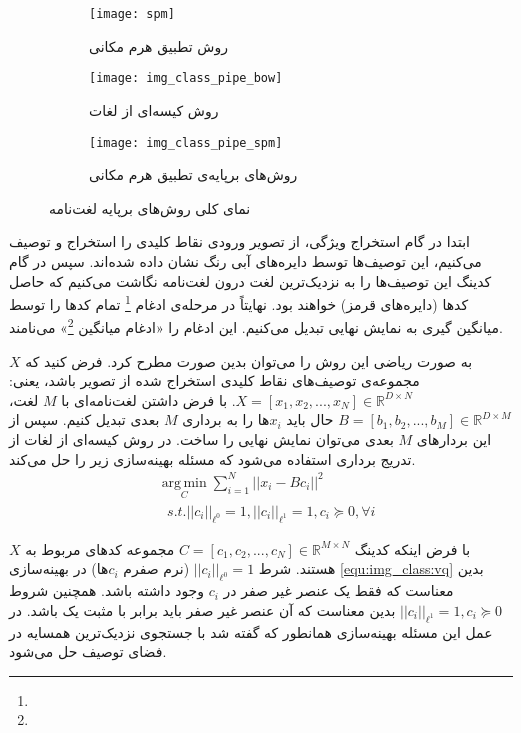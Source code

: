 \documentclass[11pt]{article}
\begin{document}
\begin{figure}[t]
	\centering
	\begin{subfigure}[h]{0.7\textwidth}
		\centering
		\texttt{[image: spm]}
		\caption{روش تطبیق هرم مکانی}
		\label{fig:img_class:pipe:spm}
	\end{subfigure}
	\begin{subfigure}[h]{0.3\textwidth}
		\centering
		\texttt{[image: img\_class\_pipe\_bow]}
		\caption{روش کیسه‌ای از لغات}
		\label{fig:img_class:pipe:bow}
	\end{subfigure}
	\begin{subfigure}[h]{0.3\textwidth}
		\centering
		\texttt{[image: img\_class\_pipe\_spm]}
		\caption{روش‌های برپایه‌ی تطبیق هرم مکانی}
		\label{fig:img_class:pipe:gen}
	\end{subfigure}
	\caption{نمای کلی روش‌های برپایه لغت‌نامه}
	\label{fig:img_class:pipe}
\end{figure}
ابتدا در گام استخراج ویژگی، از تصویر ورودی نقاط کلیدی را استخراج و توصیف می‌کنیم، این توصیف‌ها توسط دایره‌های آبی رنگ نشان داده شده‌اند. سپس در گام کدینگ این توصیف‌ها را به نزدیک‌ترین لغت درون لغت‌نامه نگاشت می‌کنیم که حاصل کدها (دایره‌های قرمز) خواهند بود. نهایتاً در مرحله‌ی ادغام
\footnote{}
تمام کدها را توسط میانگین گیری به نمایش نهایی تبدیل می‌کنیم. این ادغام را «ادغام میانگین
\footnote{}» می‌نامند.

به صورت ریاضی این روش را می‌توان بدین صورت مطرح کرد. فرض کنید که $X$ مجموعه‌ی توصیف‌های نقاط کلیدی استخراج شده از تصویر باشد، یعنی:
$X = [x_1, x_2, ..., x_N] \in \mathbb{R}^{D \times N}$.
با فرض داشتن لغت‌نامه‌ای با $M$ لغت،
$B = [b_1, b_2, ..., b_M] \in \mathbb{R}^{D \times M}$
حال باید $x_i$ها را به برداری $M$ بعدی تبدیل کنیم. سپس از این بردارهای $M$ بعدی می‌توان نمایش نهایی را ساخت.
در روش کیسه‌ای از لغات از تدریج برداری استفاده می‌شود که مسئله بهینه‌سازی زیر را حل می‌کند.
\begin{equation}
	\begin{aligned}
		&\operatorname*{arg\,min}_C \sum_{i=1}^{N} || x_i - B c_i ||^2 \\
		&{\,\,\,\,} \textit{s.t.} || c_i ||_{\ell^0} = 1, || c_i ||_{\ell^1} = 1, c_i \succeq 0, \forall i
	\end{aligned}
\label{equ:img_class:vq}
\end{equation}

با فرض اینکه کدینگ
$C = [c_1, c_2, ..., c_N] \in \mathbb{R}^{M \times N}$
مجموعه کد‌های مربوط به $X$ هستند.
شرط
$|| c_i ||_{\ell^0} = 1$
(نرم صفرم $c_i$ها) در بهینه‌سازی
\ref{equ:img_class:vq}
بدین معناست که فقط یک عنصر غیر صفر در $c_i$ وجود داشته باشد. همچنین شروط
$|| c_i ||_{\ell^1} = 1, c_i \succeq 0$
بدین معناست که آن عنصر غیر صفر باید برابر با مثبت یک باشد. در عمل این مسئله بهینه‌سازی همانطور که گفته شد با جستجوی نزدیک‌ترین همسایه در فضای توصیف حل می‌شود.
\end{document}
